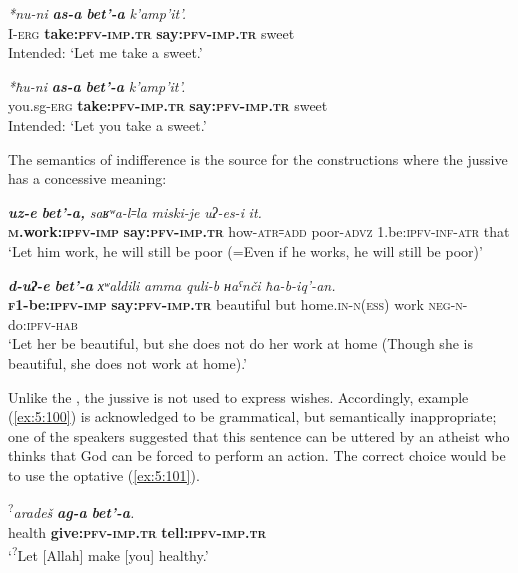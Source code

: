 ﻿\documentclass[output=paper]{langsci/langscibook}
\begin{document}
\ex %
\gll \emph{*nu-ni} \emph{\textbf{as-a}} \emph{\textbf{bet'-a}} \emph{k'amp'it'.}\\
 I-\textsc{erg} \textbf{take:\textsc{pfv}-\textsc{imp}.\textsc{tr}} \textbf{say:\textsc{pfv}-\textsc{imp}.\textsc{tr}} sweet\\
\glt Intended: `Let me take a sweet.'

\ex %
\gll \emph{*ħu-ni} \emph{\textbf{as-a}} \emph{\textbf{bet'-a}} \emph{k'amp'it'.}\\
 you.sg-\textsc{erg} \textbf{take:\textsc{pfv}-\textsc{imp}.\textsc{tr}} \textbf{say:\textsc{pfv}-\textsc{imp}.\textsc{tr}} sweet\\
\glt Intended: `Let you take a sweet.'
\z

The semantics of indifference is the source for the constructions where
the jussive has a concessive meaning:

\ea %
\gll \emph{\textbf{uz-e}} \emph{\textbf{bet'-a,}} \emph{saʁʷa-l꞊la} \emph{miski-je} \emph{uʔ-es-i} \emph{it.}\\
 \textbf{\textsc{m}.work:\textsc{ipfv}-\textsc{imp}} \textbf{say:\textsc{pfv}-\textsc{imp}.\textsc{tr}} how-\textsc{atr}꞊\textsc{add} poor-\textsc{advz} 1.be:\textsc{ipfv}-\textsc{inf}-\textsc{atr} that\\
\glt `Let him work, he will still be poor (=Even if he works, he will still be poor)'

\ex %
\gll \emph{\textbf{d-uʔ-e}} \emph{\textbf{bet'-a}} \emph{хʷaldili}  \emph{amma} \emph{quli-b} \emph{ʜaˤnči} \emph{ħa-b-iq'-an.}\\
\textbf{\textsc{f1}-be:\textsc{ipfv}-\textsc{imp}} \textbf{say:\textsc{pfv}-\textsc{imp}.\textsc{tr}} beautiful but home.\textsc{in}-\textsc{n}(\textsc{ess}) work \textsc{neg}-\textsc{n}-do:\textsc{ipfv}-\textsc{hab}\\
\glt `Let her be beautiful, but she does not do her work at home (Though
she is beautiful, she does not work at home).'
\z

Unlike the , the jussive is not used to express wishes.
Accordingly, example (\ref{ex:5:100}) is acknowledged to be grammatical, but
semantically inappropriate; one of the speakers suggested that this
sentence can be uttered by an atheist who thinks that God can be forced
to perform an action. The correct choice would be to use the optative (\ref{ex:5:101}).

\ea \label{ex:5:100} %
\gll \textsuperscript{?}\emph{aradeš} \emph{\textbf{ag-a}}  \emph{\textbf{bet'-a}.}\\
 health \textbf{give:\textsc{pfv}-\textsc{imp}.\textsc{tr}} \textbf{tell:\textsc{ipfv}-\textsc{imp}.\textsc{tr}}\\
\glt `\textsuperscript{?}Let [Allah] make [you] healthy.'
\end{document}
